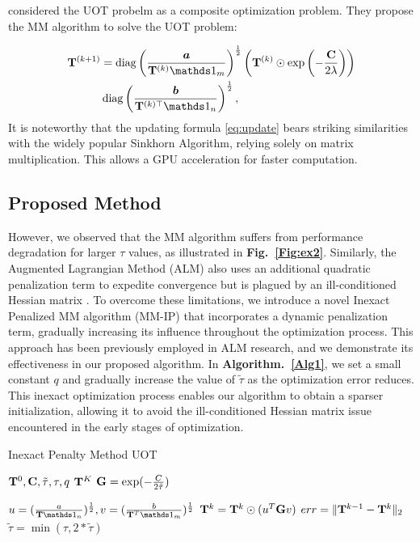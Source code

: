 \cite{Chapel_NeurIPS_2021} considered the UOT probelm as a composite optimization problem. They propose the MM algorithm to solve the UOT problem:

\begin{eqnarray}
\label{eq:update}
\mat{T}^{(k+1)}&=\operatorname{diag}\left(\frac{\vec a}{\mat{T}^{(k)} \one_m}\right)^{\frac{1}{2}}\left(\mat{T}^{(k)} \odot \exp \left(-\frac{\mat C}{2 \lambda}\right)\right)\\
& \operatorname{diag}\left(\frac{\vec{b}}{\mat{T}^{(k) \top} \one_n}\right)^{\frac{1}{2}},
\end{eqnarray}
It is noteworthy that the updating formula \ref{eq:update} bears striking similarities with the widely popular Sinkhorn Algorithm, relying solely on matrix multiplication. This allows a GPU acceleration for faster computation.
\subsection{Proposed Method}
However, we observed that the MM algorithm suffers from performance degradation for larger $\tau$ values, as illustrated in {\bf Fig.~\ref{Fig:ex2}}. Similarly, the Augmented Lagrangian Method (ALM) also uses an additional quadratic penalization term to expedite convergence but is plagued by an ill-conditioned Hessian matrix \cite{doi:10.1137/1.9781611973365}.
To overcome these limitations, we introduce a novel Inexact Penalized MM algorithm (MM-IP) that incorporates a dynamic penalization term, gradually increasing its influence throughout the optimization process. This approach has been previously employed in ALM research, and we demonstrate its effectiveness in our proposed algorithm.
In {\bf Algorithm.~\ref{Alg1}}, we set a small constant $q$ and gradually increase the value of $\tilde{\tau}$ as the optimization error reduces. This inexact optimization process enables our algorithm to obtain a sparser initialization, allowing it to avoid the ill-conditioned Hessian matrix issue encountered in the early stages of optimization.
\begin{algorithm}[t]
\caption{Inexact Penalty Method UOT}
\begin{algorithmic}[t]
\label{Alg1}
\renewcommand{\algorithmicrequire}{\textbf{Input:}}
\renewcommand{\algorithmicensure}{\textbf{Output:}}
\REQUIRE $\mathbf{T}^0, \mathbf{C}, \tilde{\tau}, \tau, q$
\ENSURE $\mathbf{T}^{K}$
\STATE $\mathbf{G} = \operatorname{exp}(-\frac{C}{2\tilde{\tau}})$

\STATE $u = (\frac{a}{\mat T \one_n})^{\frac{1}{2}}, v=(\frac{b}{\mat{T}^{T} \one_m})^{\frac{1}{2}}$
\STATE $\mathbf{T}^{k} = \mathbf{T}^{k} \odot ( u^{T} \mathbf{G} v)$
\STATE $err = \|\mathbf{T}^{k-1} - \mathbf{T}^{k}\|_2$
\STATE $\tilde{\tau} = \min(\tau, 2 *\tilde{\tau})$
\ENDIF
\ENDFOR
\end{algorithmic}
\end{algorithm}

